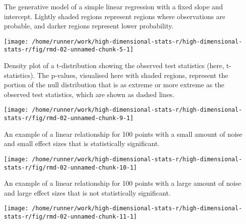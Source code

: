 \documentclass[ignorenonframetext,]{beamer}
\begin{document}
\begin{frame}{The generative model of a simple linear regression with a
fixed slope and intercept. Lightly shaded regions represent regions
where observations are probable, and darker regions represent lower
probability.}
\protect\hypertarget{the-generative-model-of-a-simple-linear-regression-with-a-fixed-slope-and-intercept.-lightly-shaded-regions-represent-regions-where-observations-are-probable-and-darker-regions-represent-lower-probability.}{}

\texttt{[image: /home/runner/work/high-dimensional-stats-r/high-dimensional-stats-r/fig/rmd-02-unnamed-chunk-5-1]}



\end{frame}

\begin{frame}{Density plot of a t-distribution showing the observed test
statistics (here, t-statistics). The p-values, visualised here with
shaded regions, represent the portion of the null distribution that is
as extreme or more extreme as the observed test statistics, which are
shown as dashed lines.}
\protect\hypertarget{density-plot-of-a-t-distribution-showing-the-observed-test-statistics-here-t-statistics.-the-p-values-visualised-here-with-shaded-regions-represent-the-portion-of-the-null-distribution-that-is-as-extreme-or-more-extreme-as-the-observed-test-statistics-which-are-shown-as-dashed-lines.}{}

\texttt{[image: /home/runner/work/high-dimensional-stats-r/high-dimensional-stats-r/fig/rmd-02-unnamed-chunk-9-1]}



\end{frame}

\begin{frame}{An example of a linear relationship for 100 points with a
small amount of noise and small effect sizes that is statistically
significant.}
\protect\hypertarget{an-example-of-a-linear-relationship-for-100-points-with-a-small-amount-of-noise-and-small-effect-sizes-that-is-statistically-significant.}{}

\texttt{[image: /home/runner/work/high-dimensional-stats-r/high-dimensional-stats-r/fig/rmd-02-unnamed-chunk-10-1]}



\end{frame}

\begin{frame}{An example of a linear relationship for 100 points with a
large amount of noise and large effect sizes that is not statistically
significant.}
\protect\hypertarget{an-example-of-a-linear-relationship-for-100-points-with-a-large-amount-of-noise-and-large-effect-sizes-that-is-not-statistically-significant.}{}

\texttt{[image: /home/runner/work/high-dimensional-stats-r/high-dimensional-stats-r/fig/rmd-02-unnamed-chunk-11-1]}



\end{frame}
\end{document}
